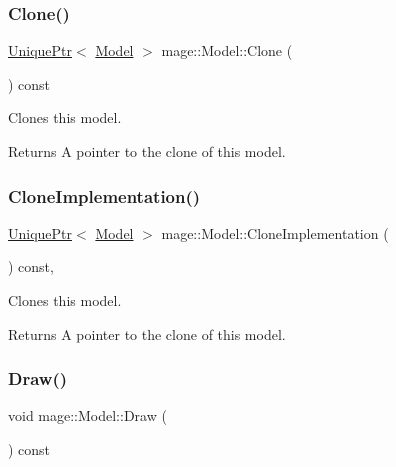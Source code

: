 \subsubsection{\texorpdfstring{Clone()}{Clone()}}
{\footnotesize\ttfamily \hyperlink{namespacemage_a8c307fbcc33bce9b7f2aa4c26c3b95cf}{Unique\+Ptr}$<$ \hyperlink{classmage_1_1_model}{Model} $>$ mage\+::\+Model\+::\+Clone (\begin{DoxyParamCaption}{ }\end{DoxyParamCaption}) const}

Clones this model.

\begin{DoxyReturn}{Returns}
A pointer to the clone of this model. 
\end{DoxyReturn}
\hypertarget{classmage_1_1_model_a4e32ba81c5305dd23dfe760765a5b7d2}{}\label{classmage_1_1_model_a4e32ba81c5305dd23dfe760765a5b7d2} 
\subsubsection{\texorpdfstring{Clone\+Implementation()}{CloneImplementation()}}
{\footnotesize\ttfamily \hyperlink{namespacemage_a8c307fbcc33bce9b7f2aa4c26c3b95cf}{Unique\+Ptr}$<$ \hyperlink{classmage_1_1_model}{Model} $>$ mage\+::\+Model\+::\+Clone\+Implementation (\begin{DoxyParamCaption}{ }\end{DoxyParamCaption}) const\hspace{0.3cm}{\ttfamily [private]}, {\ttfamily [virtual]}}

Clones this model.

\begin{DoxyReturn}{Returns}
A pointer to the clone of this model. 
\end{DoxyReturn}
\hypertarget{classmage_1_1_model_a13badcd5e7bfaf8fbdc447dc211d5ad9}{}\label{classmage_1_1_model_a13badcd5e7bfaf8fbdc447dc211d5ad9} 
\subsubsection{\texorpdfstring{Draw()}{Draw()}}
{\footnotesize\ttfamily void mage\+::\+Model\+::\+Draw (\begin{DoxyParamCaption}{ }\end{DoxyParamCaption}) const}

